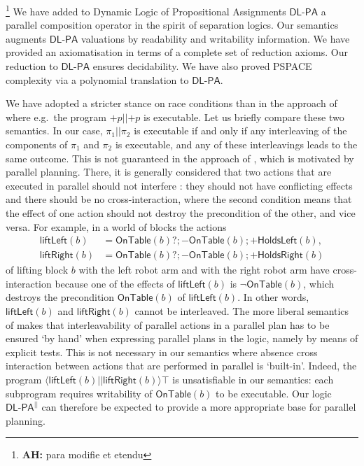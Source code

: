 \documentclass{llncs}
\newcommand{\pll}{ {||} }							%
\newcommand{\Dlpa}{\ensuremath{\mathsf{DL\text{-}PA}}\xspace}
\newcommand{\DlpaPll}{\ensuremath{\mathsf{DL\text{-}PA}^\pll}\xspace}
\newcommand{\ah}[1]{\footnote{\textbf{AH:} #1}}
\newcommand{\assgntop}[1]{{\mathtt {+} #1}}
\newcommand{\assgnbot}[1]{{\mathtt {-} #1}}
\newcommand{\ldia}[1]{ \big\langle #1 \big\rangle}
\begin{document}
\ah{
para modifie et etendu
}
We have added to Dynamic Logic of Propositional Assignments \Dlpa
a parallel composition operator in the spirit of separation logics. 
Our semantics augments \Dlpa valuations by readability and writability information. 
We have provided an axiomatisation in terms of a complete set of reduction axioms. 
Our reduction to \Dlpa ensures decidability. 
We have also proved PSPACE complexity via a polynomial translation to \Dlpa. 

We have adopted a stricter stance on race conditions than in the approach of \cite{HerzigEtal-Ijcai19} 
where e.g.\ the program $\assgntop p \pll \assgntop p$ is executable. 
Let us briefly compare these two semantics. 
In our case, $\pi_1 \pll \pi_2$ is executable if and only if any interleaving of the components of $\pi_1$ and $\pi_2$ is executable, and any of these interleavings leads to the same outcome. 
This is not guaranteed in the approach of \cite{HerzigEtal-Ijcai19}, which is motivated by parallel planning. 
There, it is generally considered that two actions that are executed in parallel should not interfere \cite{DBLP:journals/ai/BlumF97}:
they should not have conflicting effects and there should be no cross-interaction, where the second condition means that the effect of one action should not destroy the precondition of the other, and vice versa. 
For example, in a world of blocks the actions 
\begin{align*}
\mathsf{liftLeft}(b) &= \mathsf{OnTable}(b) ? ; \assgnbot{ \mathsf{OnTable}(b) } ; \assgntop{ \mathsf{HoldsLeft}(b) }  ,
\\
\mathsf{liftRight}(b) &= \mathsf{OnTable}(b) ? ; \assgnbot{ \mathsf{OnTable}(b) }  ; \assgntop{ \mathsf{HoldsRight}(b) } 
\end{align*}
of lifting block $b$ with the left robot arm and with the right robot arm have cross-interaction because 
one of the effects of $\mathsf{liftLeft}(b)$ is $\lnot \mathsf{OnTable}(b)$, which destroys the precondition $ \mathsf{OnTable}(b)$ of $\mathsf{liftLeft}(b)$. 
In other words, $\mathsf{liftLeft}(b)$ and $\mathsf{liftRight}(b) $ cannot be interleaved. 
The more liberal semantics of \cite{HerzigEtal-Ijcai19} makes that interleavability of parallel actions in a parallel plan has to be ensured `by hand' when expressing parallel plans in the logic, namely by means of explicit tests.
This is not necessary in our semantics where absence cross interaction between actions that are performed in parallel is `built-in'. 
Indeed, the program
$\ldia{ \mathsf{liftLeft}(b) \pll \mathsf{liftRight}(b) } \top $ 
is unsatisfiable in our semantics: each subprogram requires writability of $\mathsf{OnTable}(b)$ to be executable. 
Our logic \DlpaPll can therefore be expected to provide a more appropriate base for parallel planning. 
\end{document}
